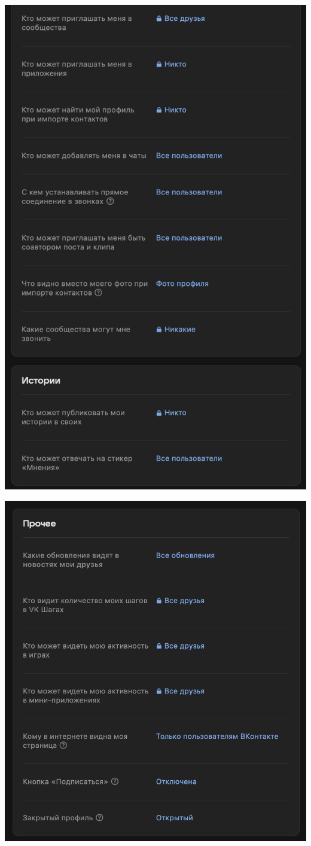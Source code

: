 \documentclass{article}
\begin{document}
\begin{center}
    \includegraphics[width=.9\textwidth]{8}
\end{center}
\begin{center}
    \includegraphics[width=.9\textwidth]{9}
\end{center}
\end{document}
